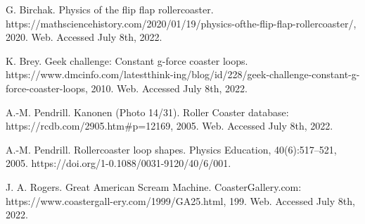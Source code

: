 \documentclass{article}
\newcommand{\startSectionHeader}[1]{
\nobreak\extramarks{#1}{}\nobreak{}
}
\begin{document}
\renewcommand{\currentSectionName}{References}
\startSectionHeader{\currentSectionName}
\pagebreak
\begin{thebibliography}{99}  

 G. Birchak. Physics of the flip flap rollercoaster. https://mathsciencehistory.com/2020/01/19/physics-ofthe-flip-flap-rollercoaster/, 2020. Web. Accessed July 8th, 2022.

 K. Brey. Geek challenge: Constant g-force coaster loops. https://www.dmcinfo.com/latestthink-ing/blog/id/228/geek-challenge-constant-g-force-coaster-loops, 2010. Web. Accessed July 8th, 2022.

 A.-M. Pendrill. Kanonen (Photo 14/31). Roller Coaster database: https://rcdb.com/2905.htm\#p=12169,
2005. Web. Accessed July 8th, 2022.

 A.-M. Pendrill. Rollercoaster loop shapes. Physics Education, 40(6):517–521, 2005.
https://doi.org/1-0.1088/0031-9120/40/6/001.

 J. A. Rogers. Great American Scream Machine. CoasterGallery.com:
https://www.coastergall-ery.com/1999/GA25.html, 199. Web. Accessed July 8th, 2022.
\end{thebibliography}
\end{document}
